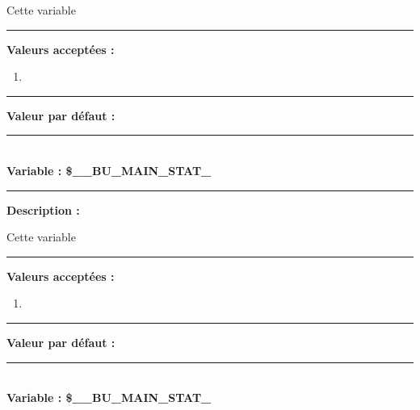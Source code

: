 \documentclass[a4paper,10pt]{article}
\begin{document}
\setlength{\parskip}{1em}

\begin{justify}
    Cette variable
\end{justify}

\par\noindent\rule{\textwidth}{0.4pt}

\textbf{Valeurs acceptées :}
\begin{enumerate}
    \item 
\end{enumerate}

\par\noindent\rule{\textwidth}{0.4pt}

\textbf{Valeur par défaut :}



\color{vars}\par\noindent\rule{\textwidth}{0.4pt}\color{text}\\[1\baselineskip]

\textbf{Variable : \color{vars}\$\_\_BU\_MAIN\_STAT\_}\\[1\baselineskip]

\par\noindent\rule{\textwidth}{0.4pt}

\begin{justify}
    \textbf{Description :}
\end{justify}

\setlength{\parskip}{1em}

\begin{justify}
    Cette variable
\end{justify}

\par\noindent\rule{\textwidth}{0.4pt}

\textbf{Valeurs acceptées :}
\begin{enumerate}
    \item 
\end{enumerate}

\par\noindent\rule{\textwidth}{0.4pt}

\textbf{Valeur par défaut :}



\color{vars}\par\noindent\rule{\textwidth}{0.4pt}\color{text}\\[1\baselineskip]

\textbf{Variable : \color{vars}\$\_\_BU\_MAIN\_STAT\_}\\[1\baselineskip]
\end{document}
